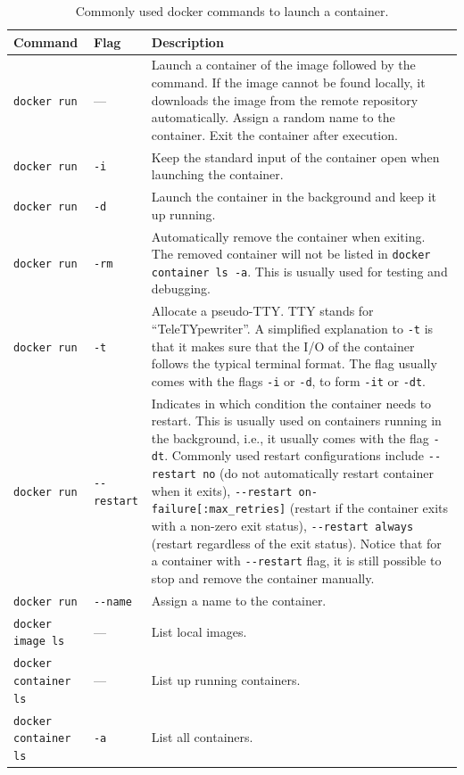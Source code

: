 \begin{table}
	\centering \caption{Commonly used docker commands to launch a container.}\label{chvirtualizationandcontainerization:tab:launchcontainer}
	\begin{tabularx}{\textwidth}{llX}
		\hline
		Command & Flag & Description \\ \hline
		\verb|docker run| & --- & Launch a container of the image followed by the command. If the image cannot be found locally, it downloads the image from the remote repository automatically. Assign a random name to the container. Exit the container after execution. \\ \hdashline
        \verb|docker run| & \verb|-i| & Keep the standard input of the container open when launching the container. \\ \hdashline
        \verb|docker run| & \verb|-d| & Launch the container in the background and keep it up running. \\ \hdashline
        \verb|docker run| & \verb|-rm| & Automatically remove the container when exiting. The removed container will not be listed in \verb|docker container ls -a|. This is usually used for testing and debugging. \\ \hdashline
        \verb|docker run| & \verb|-t| & Allocate a pseudo-TTY. TTY stands for ``TeleTYpewriter''. A simplified explanation to \verb|-t| is that it makes sure that the I/O of the container follows the typical terminal format. The flag usually comes with the flags \verb|-i| or \verb|-d|, to form \verb|-it| or \verb|-dt|. \\ \hdashline
        \verb|docker run| & \verb|--restart| & Indicates in which condition the container needs to restart. This is usually used on containers running in the background, i.e., it usually comes with the flag \verb|-dt|. Commonly used restart configurations include \verb|--restart no| (do not automatically restart container when it exits), \verb|--restart on-failure[:max_retries]| (restart if the container exits with a non-zero exit status), \verb|--restart always| (restart regardless of the exit status). Notice that for a container with \verb|--restart| flag, it is still possible to stop and remove the container manually. \\ \hdashline
        \verb|docker run| & \verb|--name| & Assign a name to the container. \\ \hline
        \verb|docker image ls| & --- & List local images. \\ \hline
        \verb|docker container ls| & --- & List up running containers. \\ \hdashline
        \verb|docker container ls| & \verb|-a| & List all containers. \\
		\hline
	\end{tabularx}
\end{table}

